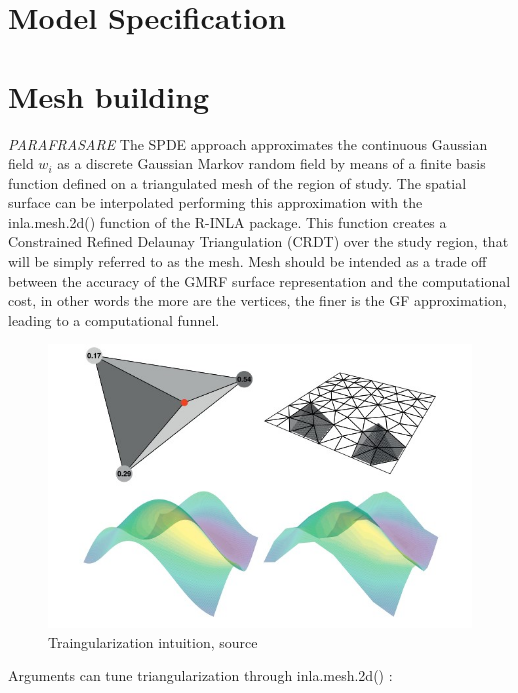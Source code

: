 \documentclass[
  12pt,
  a4paper,
  oneside]{book}
\theoremstyle{definition}
\theoremstyle{definition}
\theoremstyle{definition}
\theoremstyle{remark}
\begin{document}
\hypertarget{model-specification}{%
\section{Model Specification}\label{model-specification}}

\hypertarget{mesh-building}{%
\section{Mesh building}\label{mesh-building}}

\emph{PARAFRASARE}
The SPDE approach approximates the continuous Gaussian field \(w_{i}\) as a discrete Gaussian Markov random field by means of a finite basis function defined on a triangulated mesh of the region of study. The spatial surface can be interpolated performing this approximation with the inla.mesh.2d() function of the R-INLA package. This function creates a Constrained Refined Delaunay Triangulation (CRDT) over the study region, that will be simply referred to as the mesh. Mesh should be intended as a trade off between the accuracy of the GMRF surface representation and the computational cost, in other words the more are the vertices, the finer is the GF approximation, leading to a computational funnel.

\begin{figure}
\centering
\includegraphics{images/triangle.jpg}
\caption{Traingularization intuition, \citet{Krainski-Rubio} source}
\end{figure}

Arguments can tune triangularization through inla.mesh.2d() :
\end{document}
